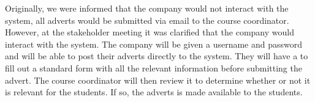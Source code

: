 \documentclass{l3deliverable}
\begin{document}
Originally, we were informed that the company would not interact with the system, all adverts
would be submitted via email to the course coordinator. However, at the stakeholder meeting
it was clarified that the company would interact with the system. The company will be given a
username and password and will be able to post their adverts directly to the system. They will
have a to fill out a standard form with all the relevant information before submitting the advert.
The course coordinator will then review it to determine whether or not it is relevant for the
students. If so, the adverts is made available to the students.
\end{document}
